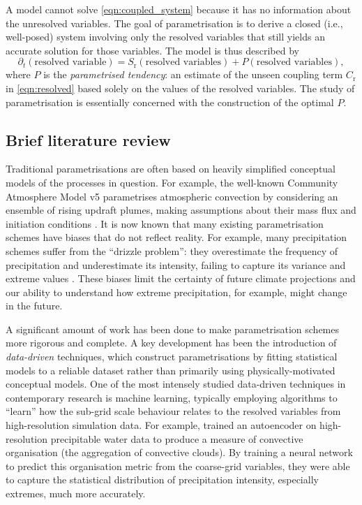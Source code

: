 \documentclass[titlepage]{article}
\begin{document}
A model cannot solve \autoref{eqn:coupled_system} because it has no information
about the unresolved variables. The goal of parametrisation is to derive a
closed (i.e., well-posed) system involving only the resolved variables that
still yields an accurate solution for those variables. The model is thus
described by
\begin{equation} \label{eqn:model}
    \partial_t (\text{resolved variable})
        = S_\mathrm{r}(\text{resolved variables})
        + P(\text{resolved variables}),
\end{equation}
where $P$ is the \emph{parametrised tendency}: an estimate of the unseen
coupling term $C_\mathrm{r}$ in \autoref{eqn:resolved} based solely on the
values of the resolved variables. The study of parametrisation is essentially
concerned with the construction of the optimal $P$.

\subsection{Brief literature review}
Traditional parametrisations are often based on heavily simplified conceptual
models of the processes in question. For example, the well-known Community
Atmosphere Model v5 \parencite{cam5} parametrises atmospheric convection by
considering an ensemble of rising updraft plumes, making assumptions about
their mass flux and initiation conditions \parencite{zhang1995}.
It is now known that many existing parametrisation schemes have biases that
do not reflect reality. For example, many precipitation schemes suffer from
the ``drizzle problem'': they overestimate the frequency of precipitation
and underestimate its intensity, failing to capture its variance and extreme
values \parencite{shamekh2022}. These biases limit the certainty of future
climate projections and our ability to understand how extreme precipitation,
for example, might change in the future.


A significant amount of work has been done to make parametrisation schemes more
rigorous and complete. A key development has been the introduction of
\emph{data-driven} techniques, which construct parametrisations by fitting
statistical models to a reliable dataset rather than primarily using
physically-motivated conceptual models. One of the most intensely studied
data-driven techniques in contemporary research is machine learning, typically
employing algorithms to ``learn'' how the sub-grid scale behaviour relates to
the resolved variables from high-resolution simulation data. For example,
\textcite{shamekh2022} trained an autoencoder on high-resolution precipitable
water data to produce a measure of convective organisation (the aggregation of
convective clouds). By training a neural network to predict this organisation
metric from the coarse-grid variables, they were able to capture the
statistical distribution of precipitation intensity, especially extremes, much
more accurately.
\end{document}
